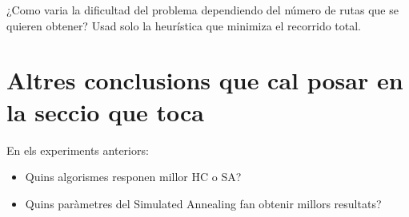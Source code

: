 ¿Como varia la dificultad del problema dependiendo del número de rutas que se quieren obtener? Usad solo la heurística que minimiza el recorrido total.




\section{Altres conclusions que cal posar en la seccio que toca} %
\label{sec:shit123}

En els experiments anteriors:
\begin{itemize}
\item Quins algorismes responen millor HC o SA?
\item Quins paràmetres del Simulated Annealing fan obtenir millors resultats?
\end{itemize}

